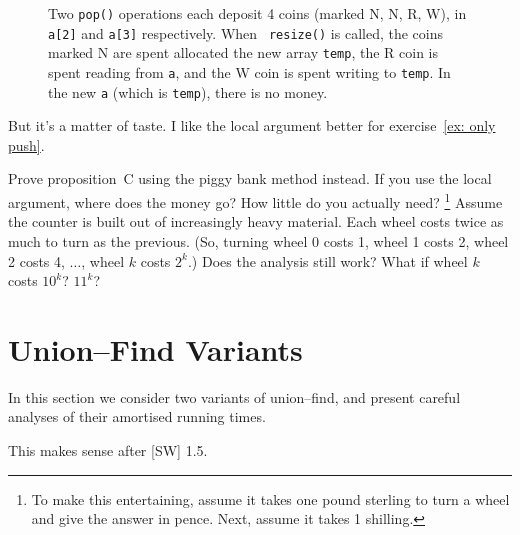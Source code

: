 \documentclass{tstextbook}
\begin{document}
\begin{figure}
  \caption{ Two {\tt pop()} operations each deposit 4 coins (marked N, N, R,
    W), in {\tt a[2]} and {\tt a[3]} respectively.  When {\tt
      resize()} is called, the coins marked N are spent allocated the
    new array {\tt temp}, the R coin is spent reading from {\tt a},
    and the W coin is spent writing to {\tt temp}. In the new {\tt a}
    (which is {\tt temp}), there is no money.  }
\end{figure}

But it's a matter of taste. I like the local argument better for
exercise~\ref{ex: only push}.



\begin{ExerciseList}
\Exercise
Prove proposition~C using the piggy bank method instead.
If you use the local argument, where does the money go?
How little do you actually need?
\footnote{To make this entertaining, assume it takes one pound
  sterling to turn a wheel and give the answer in pence.
  Next, assume it takes 1 shilling.}
\Exercise
 Assume the counter is built out of increasingly heavy material. 
 Each wheel costs twice as much to turn as the previous.
 (So, turning wheel 0 costs 1, wheel 1 costs 2, wheel 2 costs 4, 
 $\ldots$,  wheel $k$ costs $2^k$.)
 Does the analysis still work?
 What if wheel $k$ costs $10^k$? $11^k$?
\end{ExerciseList}


\chapter{Union--Find Variants}

\begin{summary}
In this section we consider two variants of union--find, and present careful analyses of their amortised running times.

This makes sense after [SW] 1.5.
\end{summary}
\end{document}
